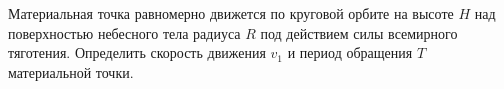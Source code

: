 Материальная точка равномерно движется по круговой орбите на высоте $H$
над поверхностью небесного тела радиуса $R$
под действием силы всемирного тяготения.
Определить скорость движения $v_1$ и период обращения $T$ материальной точки.
